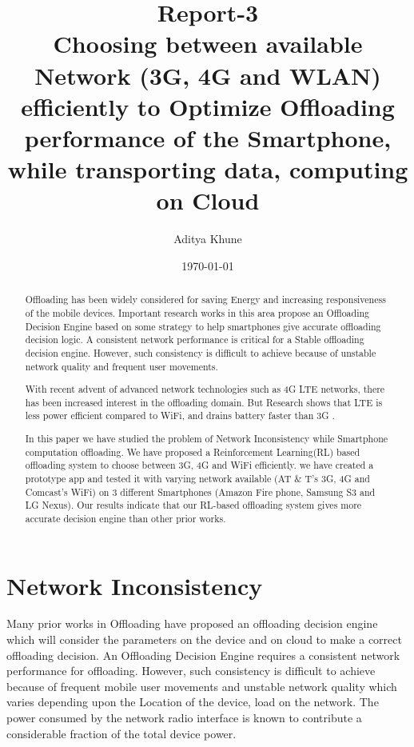 \documentclass[12pt, twocolumn]{report}
\begin{document}
\title{Report-3\\
Choosing between available Network (3G, 4G and WLAN)\\
efficiently to Optimize Offloading performance of the Smartphone, while transporting data, computing on Cloud}

\author{Aditya Khune}

\date{\today}  %
\maketitle



\begin{abstract}
Offloading has been widely considered for saving Energy and increasing responsiveness of the mobile devices.
Important research works in this area propose an Offloading Decision Engine based on some strategy to help smartphones give accurate offloading decision logic. A consistent network performance is critical for a Stable offloading decision engine. However, such consistency is difficult to achieve because of unstable network quality and frequent user movements. 

With recent advent of advanced network technologies such as 4G LTE networks, there has been increased interest in the offloading domain. But Research shows that LTE is less power efficient compared to WiFi, and drains battery faster than 3G \cite{huang2012close}.

In this paper we have studied the problem of Network Inconsistency while Smartphone computation offloading. We have proposed a Reinforcement Learning(RL) based offloading system to choose between 3G, 4G and WiFi efficiently. we have created a prototype app and tested it with varying network available (AT \& T's 3G, 4G and Comcast's WiFi) on 3 different Smartphones
(Amazon Fire phone, Samsung S3 and LG Nexus). Our results indicate that our RL-based offloading system gives more accurate decision engine than other prior works.

\end{abstract}

\chapter{Network Inconsistency} %
Many prior works in Offloading have proposed an offloading decision engine which will consider the parameters on the device and on cloud to make a correct offloading decision. An Offloading Decision Engine requires a consistent network performance for offloading. However, such consistency is difficult to achieve because of frequent mobile user movements and unstable network quality which varies depending upon the Location of the device, load on the network. The power consumed by the network radio interface is known to contribute a considerable fraction of the total device power. 
\end{document}
